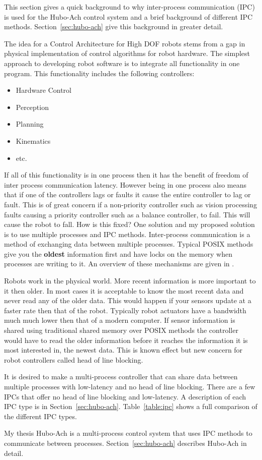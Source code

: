 
This section gives a quick background to why inter-process communication (IPC) is used for the Hubo-Ach control system and a brief background of different IPC methods.
Section~\ref{sec:hubo-ach} give this background in greater detail.

The idea for a Control Architecture for High DOF robots stems from a gap in physical implementation of control algorithms for robot hardware.
The simplest approach to developing robot software is to integrate all functionality in one program.  
This functionality includes the following controllers:
\begin{itemize}
\item Hardware Control
\item Perception
\item Planning
\item Kinematics
\item etc.
\end{itemize}

If all of this functionality is in one process then it has the benefit of freedom of inter process communication latency.
However being in one process also means that if one of the controllers lags or faults it cause the entire controller to lag or fault.
This is of great concern if a non-priority controller such as vision processing faults causing a priority controller such as a balance controller, to fail.
This will cause the robot to fall.
How is this fixed?
One solution and my proposed solution is to use multiple processes and IPC methods.
Inter-process communication is a method of exchanging data between multiple processes.
Typical POSIX methods give you the \textbf{oldest} information first and have locks on the memory when processes are writing to it.
An overview of these mechanisms are given in \cite{stevens2005advanced}.

Robots work in the physical world. 
More recent information is more important to it then older.
In most cases it is acceptable to know the most recent data and never read any of the older data.
This would happen if your sensors update at a faster rate then that of the robot.
Typically robot actuators have a bandwidth much much lower then that of a modern computer.
If sensor information is shared using traditional shared memory over POSIX methods the controller would have to read the older information before it reaches the information it is most interested in, the newest data.
This is known effect but new concern for robot controllers called head of line blocking\cite{ach}.

It is desired to make a multi-process controller that can share data between multiple processes with low-latency and no head of line blocking.
There are a few IPCs that offer no head of line blocking and low-latency.  
A description of each IPC type is in Section~\ref{sec:hubo-ach}.
Table~\ref{table:ipc} shows a full comparison of the different IPC types.

My thesis Hubo-Ach is a multi-process control system that uses IPC methods to communicate between processes.
Section~\ref{sec:hubo-ach} describes Hubo-Ach in detail.


